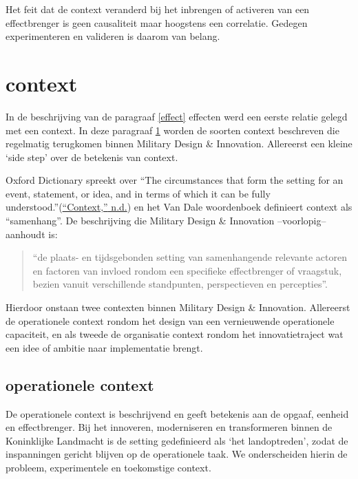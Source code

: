 \documentclass[
]{book}
\begin{document}
Het feit dat de context veranderd bij het inbrengen of activeren van een effectbrenger is geen causaliteit maar hoogstens een correlatie. Gedegen experimenteren en valideren is daarom van belang.

\hypertarget{context}{%
\section{context}\label{context}}

In de beschrijving van de paragraaf \ref{effect} effecten werd een eerste relatie gelegd met een context. In deze paragraaf \ref{context} worden de soorten context beschreven die regelmatig terugkomen binnen Military Design \& Innovation. Allereerst een kleine `side step' over de betekenis van context.

Oxford Dictionary spreekt over ``The circumstances that form the setting for an event, statement, or idea, and in terms of which it can be fully understood.''(\protect\hyperlink{ref-context}{{``Context,''} n.d.}) en het Van Dale woordenboek definieert context als ``samenhang''. De beschrijving die Military Design \& Innovation --voorlopig-- aanhoudt is:

\begin{quote}
``de plaats- en tijdsgebonden setting van samenhangende relevante actoren en factoren van invloed rondom een specifieke effectbrenger of vraagstuk, bezien vanuit verschillende standpunten, perspectieven en percepties''.
\end{quote}

Hierdoor onstaan twee contexten binnen Military Design \& Innovation. Allereerst de operationele context rondom het design van een vernieuwende operationele capaciteit, en als tweede de organisatie context rondom het innovatietraject wat een idee of ambitie naar implementatie brengt.

\hypertarget{operationele-context}{%
\subsection{operationele context}\label{operationele-context}}

De operationele context is beschrijvend en geeft betekenis aan de opgaaf, eenheid en effectbrenger. Bij het innoveren, moderniseren en transformeren binnen de Koninklijke Landmacht is de setting gedefinieerd als `het landoptreden', zodat de inspanningen gericht blijven op de operationele taak. We onderscheiden hierin de probleem, experimentele en toekomstige context.
\end{document}
